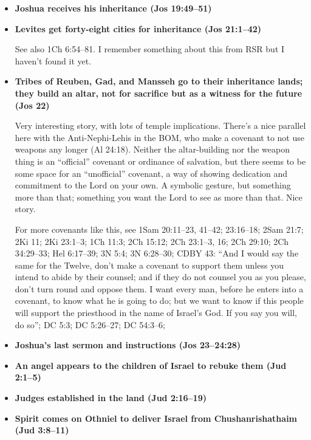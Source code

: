 \begin{itemize}
	Note that this is the first occurrence of the word ``tabernacle'' since Deu 31.
	
\item \textbf{Joshua receives his inheritance (Jos 19:49--51)}

\item \textbf{Levites get forty-eight cities for inheritance (Jos 21:1--42)}

	See also 1Ch 6:54--81. I remember something about this from RSR but I haven't found it yet.

\item \textbf{Tribes of Reuben, Gad, and Mansseh go to their inheritance lands; they build an altar, not for sacrifice but as a witness for the future (Jos 22)} %

	Very interesting story, with lots of temple implications. There's a nice parallel here with the Anti-Nephi-Lehis in the BOM, who make a covenant to not use weapons any longer (Al 24:18). Neither the altar-building nor the weapon thing is an ``official'' covenant or ordinance of salvation, but there seems to be some space for an ``unofficial'' covenant, a way of showing dedication and commitment to the Lord on your own. A symbolic gesture, but something more than that; something you want the Lord to see as more than that. Nice story.
	
	For more covenants like this, see 1Sam 20:11--23, 41--42; 23:16--18; 2Sam 21:7; 2Ki 11; 2Ki 23:1--3; 1Ch 11:3; 2Ch 15:12; 2Ch 23:1--3, 16; 2Ch 29:10; 2Ch 34:29--33; Hel 6:17--39; 3N 5:4; 3N 6:28--30; CDBY 43: ``And I would say the same for the Twelve, don't make a covenant to support them unless you intend to abide by their counsel; and if they do not counsel you as you please, don't turn round and oppose them. I want every man, before he enters into a covenant, to know what he is going to do; but we want to know if this people will support the priesthood in the name of Israel's God. If you say you will, do so''; DC 5:3; DC 5:26--27; DC 54:3--6; 

\item \textbf{Joshua's last sermon and instructions (Jos 23--24:28)}

\item \textbf{An angel appears to the children of Israel to rebuke them (Jud 2:1--5)}

\item \textbf{Judges established in the land (Jud 2:16--19)}

\item \textbf{Spirit comes on Othniel to deliver Israel from Chushanrishathaim (Jud 3:8--11)}


\end{itemize}
